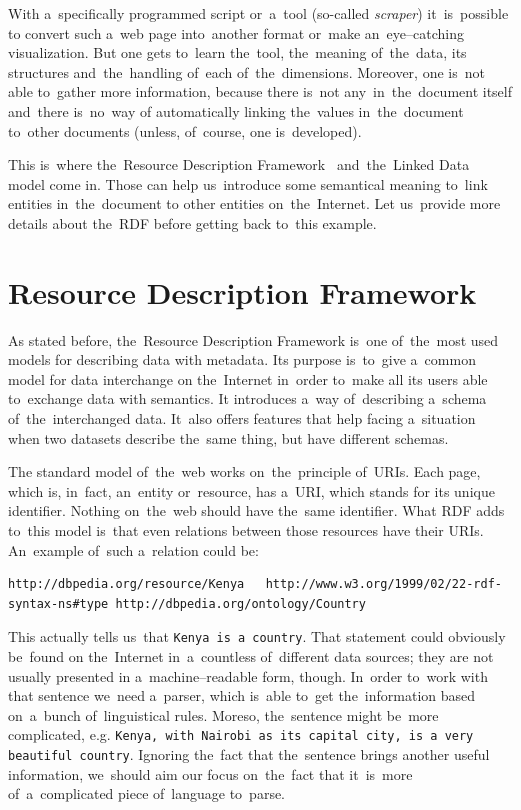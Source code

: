 With a~specifically programmed script or~a~tool (so-called \emph{scraper}) it~is~possible to
convert such a~web page into~another format or~make an~eye--catching visualization.
But one gets to~learn the~tool, the~meaning of~the~data, its structures and~the~handling of~each of~the~dimensions. Moreover, one is~not able to~gather more information,
because there is~not any~in~the~document itself and~there is~no~way of
automatically linking the~values in~the~document to~other documents (unless, of~course,
one is~developed).

This is~where the~Resource Description Framework~\cite{rdf} and~the~Linked Data~\cite{ld}
model come in. Those
can help us~introduce some semantical meaning to~link entities in~the~document to
other entities on~the~Internet. Let us~provide more details about the~RDF before getting
back to~this example.

\section{Resource Description Framework}
As stated before, the~Resource Description Framework is~one of~the~most used models for
describing data with metadata. Its purpose is~to~give a~common model for data interchange
on the~Internet in~order to~make all its users able to~exchange data with semantics.
It introduces a~way of~describing a~schema of~the~interchanged data. It~also 
offers features that help facing a~situation when two datasets describe the~same thing,
but have different schemas.

The standard model of~the~web works on~the~principle of~URIs. Each page, which is, in~fact,
an~entity or~resource, has a~URI, which stands for its unique identifier. Nothing on~the~web
should have the~same identifier. What RDF adds to~this model is~that even relations
between those resources have their URIs. An~example of~such a~relation could be:

\tiny\begin{verbatim}
http://dbpedia.org/resource/Kenya   http://www.w3.org/1999/02/22-rdf-syntax-ns#type http://dbpedia.org/ontology/Country  
\end{verbatim}\normalsize

This actually tells us~that \texttt{Kenya is~a~country}. That statement could obviously be~found on
the~Internet in~a~countless of~different data sources; they are not usually presented
in a~machine--readable form, though. In~order to~work with that sentence we~need a~parser, which is~able to~get the~information based on~a~bunch of~linguistical rules.
Moreso, the~sentence might be~more complicated, e.g. \texttt{Kenya, with Nairobi as~its capital city,
is a~very beautiful country}. Ignoring the~fact that the~sentence brings another useful
information, we~should aim our focus on~the~fact that it~is~more of~a~complicated piece of~language to~parse. 


